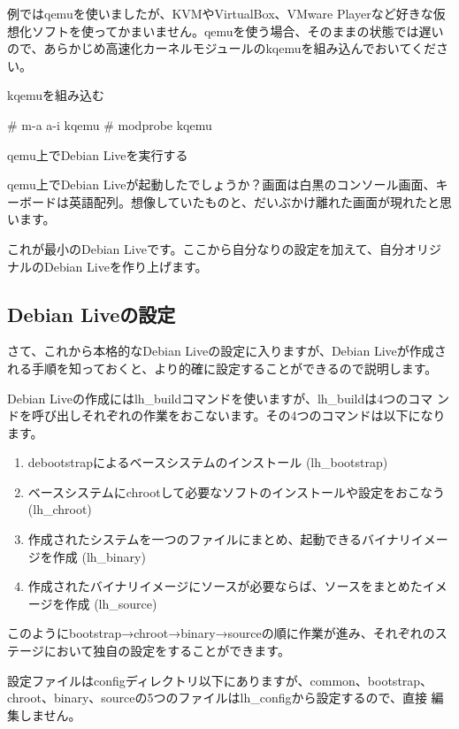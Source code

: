 \documentclass[mingoth,a4paper]{jsarticle}
\begin{document}
例ではqemuを使いましたが、KVMやVirtualBox、VMware Playerなど好きな仮想化ソフトを使ってかまいません。qemuを使う場合、そのままの状態では遅いので、あらかじめ高速化カーネルモジュールのkqemuを組み込んでおいてください。

kqemuを組み込む
\begin{commandline}
# m-a a-i kqemu
# modprobe kqemu
\end{commandline}

qemu上でDebian Liveを実行する

qemu上でDebian Liveが起動したでしょうか？画面は白黒のコンソール画面、キーボードは英語配列。想像していたものと、だいぶかけ離れた画面が現れたと思います。

これが最小のDebian Liveです。ここから自分なりの設定を加えて、自分オリジナルのDebian Liveを作り上げます。

\newpage

\subsection{Debian Liveの設定}
さて、これから本格的なDebian Liveの設定に入りますが、Debian Liveが作成される手順を知っておくと、より的確に設定することができるので説明します。

Debian Liveの作成にはlh\_buildコマンドを使いますが、lh\_buildは4つのコマ
ンドを呼び出しそれぞれの作業をおこないます。その4つのコマンドは以下になります。

\begin{enumerate}
 \item debootstrapによるベースシステムのインストール (lh\_bootstrap)
 \item ベースシステムにchrootして必要なソフトのインストールや設定をおこなう(lh\_chroot)
 \item 作成されたシステムを一つのファイルにまとめ、起動できるバイナリイメージを作成 (lh\_binary)
 \item 作成されたバイナリイメージにソースが必要ならば、ソースをまとめたイメージを作成 (lh\_source)
\end{enumerate}

このようにbootstrap→chroot→binary→sourceの順に作業が進み、それぞれのステージにおいて独自の設定をすることができます。

設定ファイルはconfigディレクトリ以下にありますが、common、bootstrap、
chroot、binary、sourceの5つのファイルはlh\_configから設定するので、直接
編集しません。
\end{document}
